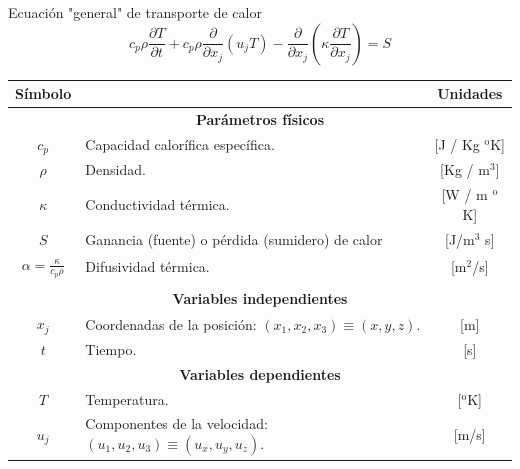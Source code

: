 \documentclass{beamer}
\begin{document}
\begin{frame}{Ecuación "general" de transporte de calor}
%
\begin{equation}
c_p \rho \frac{\partial T}{\partial t} +
c_p \rho \frac{\partial}{\partial x_j} \left( u_j T \right) -
\frac{\partial }{\partial x_j} \left( \kappa \frac{\partial T}{\partial x_j}\right) = 
S
\end{equation}
%
{\footnotesize 
\begin{center}
	\begin{tabular}[h!]{cp{8cm}c}
		Símbolo &  & Unidades \\
		\hline
		\multicolumn{3}{c}{\textbf{Parámetros físicos}}\\
		$c_p$    & Capacidad calorífica específica. & [J / Kg $^\text{o}$K]\\
		$\rho$    & Densidad. & [Kg / m$^3$]\\
		$\kappa$ & Conductividad térmica. &  [W / m $^\text{o}$K] \\
		$S$ & Ganancia (fuente) o pérdida (sumidero) de calor & [J/m$^3$ s] \\
		
		$\displaystyle \alpha = \frac{\kappa}{c_p \rho}$ & Difusividad térmica. & [m$^2$/s] \\ \\
		\hline
		\multicolumn{3}{c}{\textbf{Variables independientes}}\\
		$x_j$    & Coordenadas de la posición: $(x_1, x_2, x_3) \equiv (x, y, z)$. & [m] \\
		$t$      & Tiempo. & [s] \\
		\hline
		\multicolumn{3}{c}{\textbf{Variables dependientes}}\\
		$T$    & Temperatura. & [$^\text{o}$K] \\
		$u_j$ & Componentes de la velocidad: $(u_1, u_2, u_3) \equiv (u_x, u_y, u_z)$. & [m/s] \\
		\hline
	\end{tabular}
\end{center}
}

\end{frame}
\end{document}
